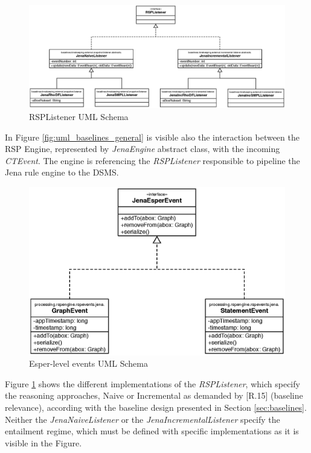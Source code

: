 \begin{figure}[tbh]
  \centering
	\includegraphics[width=\linewidth]{images/uml_baselines_listener}
	\caption{RSPListener UML Schema} 
  	\label{fig:uml_baselines_listener}
\end{figure}

In Figure \ref{fig:uml_baselines_general} is visible also the interaction between  the RSP Engine, represented by \textit{JenaEngine} abstract class, with the incoming \textit{CTEvent}. The engine is referencing the \textit{RSPListener} responsible to pipeline the Jena rule engine to the DSMS. 

\begin{figure}[tbh]
  \centering
	\includegraphics[width=0.5\linewidth]{images/uml_baselines_events}
	\caption{Esper-level events UML Schema} 
  	\label{fig:uml_baselines_events}
\end{figure}

Figure \ref{fig:uml_baselines_listener} shows the different implementations of the \textit{RSPListener}, which specify the reasoning approaches, Naive or Incremental as demanded by [R.15] (baseline relevance), according with the baseline design presented in Section \ref{sec:baselines}. Neither the \textit{JenaNaiveListener} or the \textit{JenaIncrementalListener} specify the entailment regime, which must be defined with specific implementations as it is visible in the Figure.\\

\pagebreak

